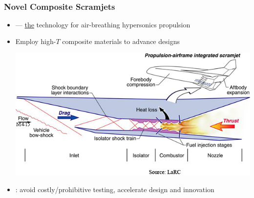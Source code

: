 \begin{frame}\frametitle{Novel Composite Scramjets}



\begin{itemize}
\item {} --- \underline{the} technology for air-breathing
  hypersonics propulsion

\item Employ high-$T$ composite materials to advance designs

\begin{center}
\begin{minipage}{0.45\textwidth}
\includegraphics[width=\textwidth]{Figures/scramjet-LaRC.png}
\end{minipage}
\hfil
\begin{minipage}{0.45\textwidth}
\end{minipage}
\end{center}


  \item {}:  avoid costly/prohibitive testing,
    accelerate design and innovation

\end{itemize}

\end{frame}

